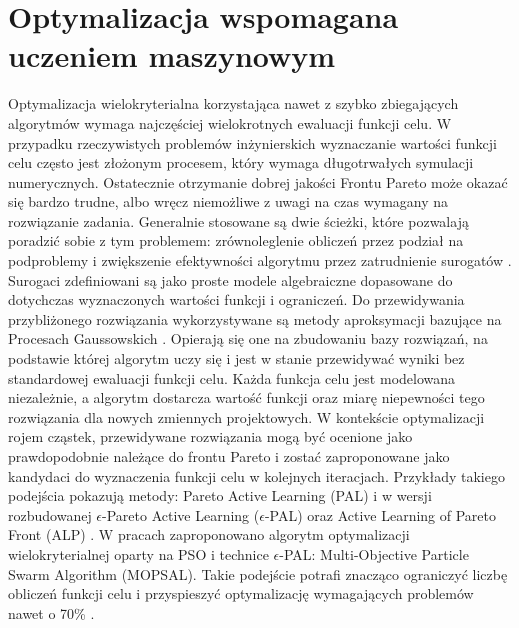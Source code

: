 \section{Optymalizacja wspomagana uczeniem maszynowym}
Optymalizacja wielokryterialna korzystająca nawet z szybko zbiegających algorytmów wymaga najczęściej wielokrotnych ewaluacji funkcji celu. W przypadku rzeczywistych problemów inżynierskich wyznaczanie wartości funkcji celu często jest złożonym procesem, który wymaga długotrwałych symulacji numerycznych. Ostatecznie otrzymanie dobrej jakości Frontu Pareto może okazać się bardzo trudne, albo wręcz niemożliwe z uwagi na czas wymagany na rozwiązanie zadania. Generalnie stosowane są dwie ścieżki, które pozwalają poradzić sobie z tym problemem: zrównoleglenie obliczeń przez podział na podproblemy i zwiększenie efektywności algorytmu przez zatrudnienie surogatów  \parencite{Haftka2016}. Surogaci zdefiniowani są jako proste modele algebraiczne dopasowane do dotychczas wyznaczonych wartości funkcji i ograniczeń. Do przewidywania przybliżonego rozwiązania wykorzystywane są metody aproksymacji bazujące na Procesach Gaussowskich  \parencite{Rasmussen2006,Rasmussen2010}. Opierają się one na zbudowaniu bazy rozwiązań, na podstawie której algorytm uczy się i jest w stanie przewidywać wyniki bez standardowej ewaluacji funkcji celu. Każda funkcja celu jest modelowana niezależnie, a algorytm dostarcza wartość funkcji oraz miarę niepewności tego rozwiązania dla nowych zmiennych projektowych. 
W kontekście optymalizacji rojem cząstek, przewidywane rozwiązania mogą być ocenione jako prawdopodobnie należące do frontu Pareto i zostać zaproponowane jako kandydaci do wyznaczenia funkcji celu w kolejnych iteracjach. Przykłady takiego podejścia pokazują metody: Pareto Active Learning (PAL) \parencite{Zuluaga2013} i w wersji rozbudowanej $\epsilon$-Pareto Active Learning ($\epsilon$-PAL) \parencite{Zuluaga2016} oraz Active Learning of Pareto Front (ALP) \parencite{Campigotto2013}. W pracach \cite{Lv2017,Lv2019} zaproponowano algorytm optymalizacji wielokryterialnej oparty na PSO i technice $\epsilon$-PAL: Multi-Objective Particle Swarm Algorithm (MOPSAL). Takie podejście potrafi znacząco ograniczyć liczbę obliczeń funkcji celu i przyspieszyć optymalizację wymagających problemów nawet o 70\% \parencite{Zuluaga2016}.




